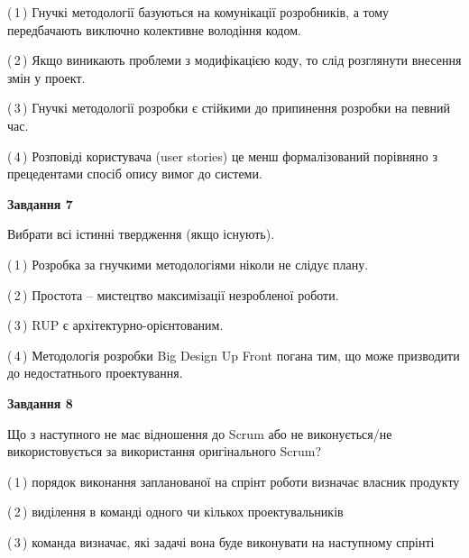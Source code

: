 \documentclass[10pt, ukrainian]{article}
\begin{document}
{\begin {large}
(\,1\,) Гнучкі методології базуються на комунікації розробників, а тому передбачають виключно колективне володіння кодом. %



(\,2\,) Якщо виникають проблеми з модифікацією коду, то слід розглянути внесення змін у проект. %



(\,3\,) Гнучкі методології розробки є стійкими до припинення розробки на певний час. %



(\,4\,) Розповіді користувача (user stories) це менш формалізований порівняно з прецедентами спосіб опису вимог до системи. %


{\begin {center}\textbf{Завдання 7}\end {center}}\par
Вибрати всі істинні твердження (якщо існують).\par
\vspace{2mm}



(\,1\,) Розробка за гнучкими методологіями ніколи не слідує плану. %



(\,2\,) Простота – мистецтво максимізації незробленої роботи. %



(\,3\,) RUP є архітектурно-орієнтованим. %



(\,4\,) Методологія розробки Big Design Up Front погана тим, що може призводити до недостатнього проектування.%


{\begin {center}\textbf{Завдання 8}\end {center}}\par
Що з наступного не має відношення до Scrum або не виконується/не використовується за використання оригінального Scrum?\par
\vspace{2mm}



(\,1\,) порядок виконання запланованої на спрінт роботи визначає власник продукту%



(\,2\,) виділення в команді одного чи кількох проектувальників%



(\,3\,) команда визначає, які задачі вона буде виконувати на наступному спрінті%




\end{large}}
\end{document}
